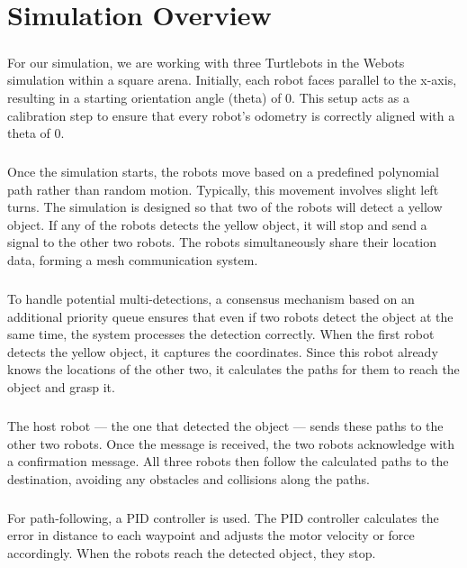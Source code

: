 \chapter{Simulation Overview}

\paragraph*{}
For our simulation, we are working with three Turtlebots in the Webots simulation within a square arena. Initially, each robot faces parallel to the x-axis, resulting in a starting orientation angle (theta) of 0. This setup acts as a calibration step to ensure that every robot's odometry is correctly aligned with a theta of 0.

\paragraph*{}
Once the simulation starts, the robots move based on a predefined polynomial path rather than random motion. Typically, this movement involves slight left turns. The simulation is designed so that two of the robots will detect a yellow object. If any of the robots detects the yellow object, it will stop and send a signal to the other two robots. The robots simultaneously share their location data, forming a mesh communication system.

\paragraph*{}
To handle potential multi-detections, a consensus mechanism based on an additional priority queue ensures that even if two robots detect the object at the same time, the system processes the detection correctly. When the first robot detects the yellow object, it captures the coordinates. Since this robot already knows the locations of the other two, it calculates the paths for them to reach the object and grasp it.

\paragraph*{}
The host robot — the one that detected the object — sends these paths to the other two robots. Once the message is received, the two robots acknowledge with a confirmation message. All three robots then follow the calculated paths to the destination, avoiding any obstacles and collisions along the paths.

\paragraph*{}
For path-following, a PID controller is used. The PID controller calculates the error in distance to each waypoint and adjusts the motor velocity or force accordingly. When the robots reach the detected object, they stop.

